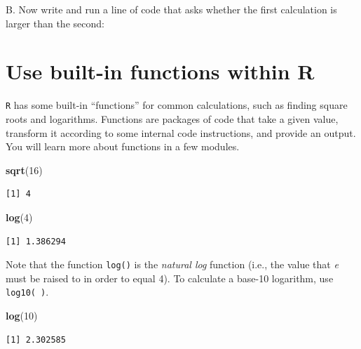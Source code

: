 \documentclass[
]{book}
\newenvironment{Shaded}{\begin{snugshade}}{\end{snugshade}}
\newcommand{\DecValTok}[1]{\textcolor[rgb]{0.00,0.00,0.81}{#1}}
\newcommand{\KeywordTok}[1]{\textcolor[rgb]{0.13,0.29,0.53}{\textbf{#1}}}
\newcommand{\NormalTok}[1]{#1}
\begin{document}
B. Now write and run a line of code that asks whether the first calculation is larger than the second:

\hypertarget{use-built-in-functions-within-r}{%
\section*{Use built-in functions within R}\label{use-built-in-functions-within-r}}

\texttt{R} has some built-in ``functions'' for common calculations, such as finding square roots and logarithms. Functions are packages of code that take a given value, transform it according to some internal code instructions, and provide an output. You will learn more about functions in a few modules.

\begin{Shaded}
\begin{Highlighting}[]
\KeywordTok{sqrt}\NormalTok{(}\DecValTok{16}\NormalTok{)}
\end{Highlighting}
\end{Shaded}

\begin{verbatim}
[1] 4
\end{verbatim}

\begin{Shaded}
\begin{Highlighting}[]
\KeywordTok{log}\NormalTok{(}\DecValTok{4}\NormalTok{)}
\end{Highlighting}
\end{Shaded}

\begin{verbatim}
[1] 1.386294
\end{verbatim}

Note that the function \texttt{log()} is the \emph{natural log} function (i.e., the value that \emph{e} must be raised to in order to equal 4). To calculate a base-10 logarithm, use \texttt{log10(\ )}.

\begin{Shaded}
\begin{Highlighting}[]
\KeywordTok{log}\NormalTok{(}\DecValTok{10}\NormalTok{)}
\end{Highlighting}
\end{Shaded}

\begin{verbatim}
[1] 2.302585
\end{verbatim}
\end{document}
